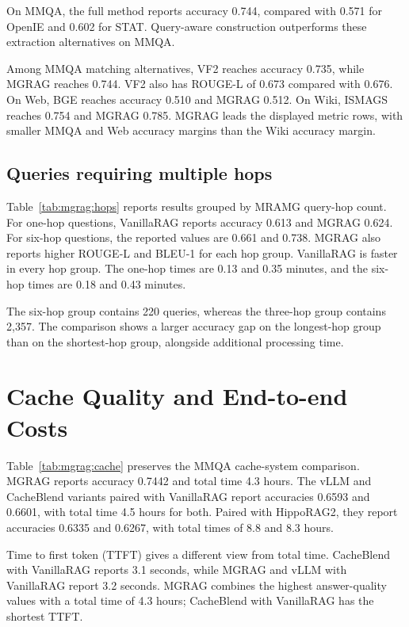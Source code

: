 

On MMQA, the full method reports accuracy 0.744, compared with 0.571 for OpenIE and 0.602 for STAT. Query-aware construction outperforms these extraction alternatives on MMQA.

Among MMQA matching alternatives, VF2 reaches accuracy 0.735, while MGRAG reaches 0.744. VF2 also has ROUGE-L of 0.673 compared with 0.676. On Web, BGE reaches accuracy 0.510 and MGRAG 0.512. On Wiki, ISMAGS reaches 0.754 and MGRAG 0.785. MGRAG leads the displayed metric rows, with smaller MMQA and Web accuracy margins than the Wiki accuracy margin.

\subsection{Queries requiring multiple hops}

Table~\ref{tab:mgrag:hops} reports results grouped by MRAMG query-hop count. For one-hop questions, VanillaRAG reports accuracy 0.613 and MGRAG 0.624. For six-hop questions, the reported values are 0.661 and 0.738. MGRAG also reports higher ROUGE-L and BLEU-1 for each hop group. VanillaRAG is faster in every hop group. The one-hop times are 0.13 and 0.35 minutes, and the six-hop times are 0.18 and 0.43 minutes.



The six-hop group contains 220 queries, whereas the three-hop group contains 2,357. The comparison shows a larger accuracy gap on the longest-hop group than on the shortest-hop group, alongside additional processing time.

\section{Cache Quality and End-to-end Costs}
\label{sec:mgrag:cost-results}

Table~\ref{tab:mgrag:cache} preserves the MMQA cache-system comparison. MGRAG reports accuracy 0.7442 and total time 4.3 hours. The vLLM and CacheBlend variants paired with VanillaRAG report accuracies 0.6593 and 0.6601, with total time 4.5 hours for both. Paired with HippoRAG2, they report accuracies 0.6335 and 0.6267, with total times of 8.8 and 8.3 hours.



Time to first token (TTFT) gives a different view from total time. CacheBlend with VanillaRAG reports 3.1 seconds, while MGRAG and vLLM with VanillaRAG report 3.2 seconds. MGRAG combines the highest answer-quality values with a total time of 4.3 hours; CacheBlend with VanillaRAG has the shortest TTFT.

